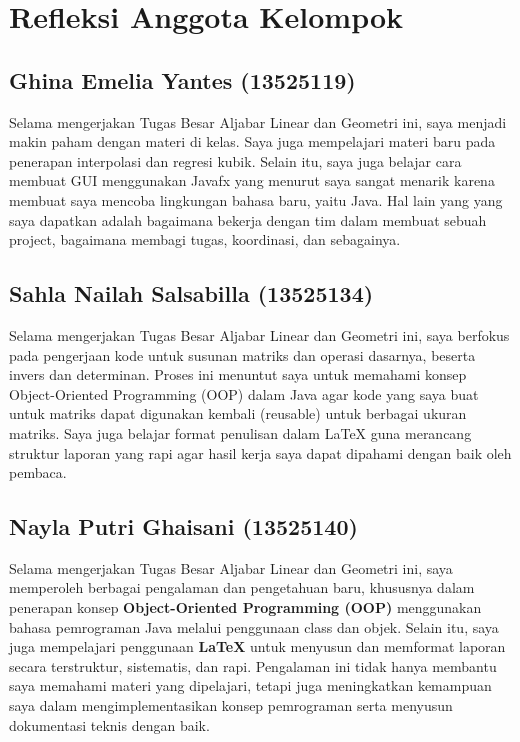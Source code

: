 \documentclass[12pt,a4paper]{report}
\begin{document}
\section{Refleksi Anggota Kelompok}

\subsection*{Ghina Emelia Yantes (13525119)}
Selama mengerjakan Tugas Besar Aljabar Linear dan Geometri ini, saya menjadi makin paham dengan materi di kelas. Saya juga mempelajari materi baru pada penerapan interpolasi dan regresi kubik. Selain itu, saya juga belajar cara membuat GUI menggunakan Javafx yang menurut saya sangat menarik karena membuat saya mencoba lingkungan bahasa baru, yaitu Java. Hal lain yang yang saya dapatkan adalah bagaimana bekerja dengan tim dalam membuat sebuah project, bagaimana membagi tugas, koordinasi, dan sebagainya.
\subsection*{Sahla Nailah Salsabilla (13525134)}
Selama mengerjakan Tugas Besar Aljabar Linear dan Geometri ini, saya berfokus pada pengerjaan kode untuk susunan matriks dan operasi dasarnya, beserta invers dan determinan. Proses ini menuntut saya untuk memahami konsep Object-Oriented Programming (OOP) dalam Java agar kode yang saya buat untuk matriks dapat digunakan kembali (reusable) untuk berbagai ukuran matriks. Saya juga belajar format penulisan dalam LaTeX guna merancang struktur laporan yang rapi agar hasil kerja saya dapat dipahami dengan baik oleh pembaca.
\subsection*{Nayla Putri Ghaisani (13525140)}
Selama mengerjakan Tugas Besar Aljabar Linear dan Geometri ini, saya memperoleh berbagai pengalaman dan pengetahuan baru, khususnya dalam penerapan konsep \textbf{Object-Oriented Programming (OOP)} menggunakan bahasa pemrograman Java melalui penggunaan class dan objek. Selain itu, saya juga mempelajari penggunaan \textbf{LaTeX} untuk menyusun dan memformat laporan secara terstruktur, sistematis, dan rapi. Pengalaman ini tidak hanya membantu saya memahami materi yang dipelajari, tetapi juga meningkatkan kemampuan saya dalam mengimplementasikan konsep pemrograman serta menyusun dokumentasi teknis dengan baik.

\newpage 
{} 
 \renewcommand{\bibname}{\thechapter \quad Daftar Pustaka}
\end{document}
